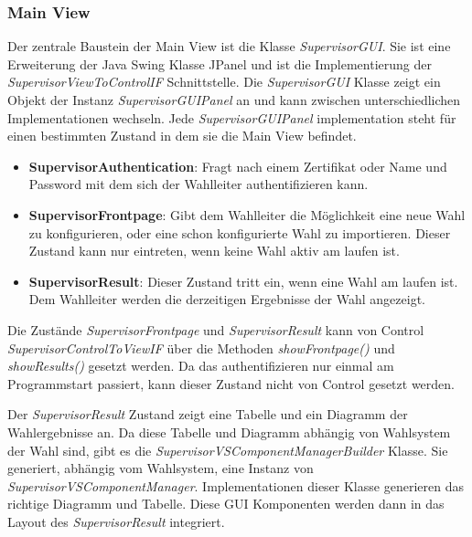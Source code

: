 \documentclass[parskip=full]{scrartcl}
\newcommand{\textitx}[1]{\mbox{\textit{#1}}}
\newcommand{\fakeparagraph}[1]{\textbf{#1}}
\begin{document}
		\subsubsection{Main View}
		Der zentrale Baustein der Main View ist die Klasse \textitx{SupervisorGUI}. Sie ist eine Erweiterung der Java Swing Klasse JPanel und ist die Implementierung der \textit{SupervisorViewToControlIF} Schnittstelle. Die \textitx{SupervisorGUI} Klasse zeigt ein Objekt der Instanz \textitx{SupervisorGUIPanel} an und kann zwischen unterschiedlichen Implementationen wechseln. Jede \textitx{SupervisorGUIPanel} implementation steht für einen bestimmten Zustand in dem sie die Main View befindet.
		\begin{itemize}
			\item\fakeparagraph{SupervisorAuthentication}: Fragt nach einem Zertifikat oder Name und Password mit dem sich der Wahlleiter authentifizieren kann.
			\item\fakeparagraph{SupervisorFrontpage}: Gibt dem Wahlleiter die Möglichkeit eine neue Wahl zu konfigurieren, oder eine schon konfigurierte Wahl zu importieren. Dieser Zustand kann nur eintreten, wenn keine Wahl aktiv am laufen ist.
			\item\fakeparagraph{SupervisorResult}: Dieser Zustand tritt ein, wenn eine Wahl am laufen ist. Dem Wahlleiter werden die derzeitigen Ergebnisse der Wahl angezeigt.
		\end{itemize}
	
		Die Zustände \textitx{SupervisorFrontpage} und \textitx{SupervisorResult} kann von Control \textit{SupervisorControlToViewIF} über die Methoden \textitx{showFrontpage()} und \textitx{showResults()} gesetzt werden. Da das authentifizieren nur einmal am Programmstart passiert, kann dieser Zustand nicht von Control gesetzt werden.
		
		Der \textitx{SupervisorResult} Zustand zeigt eine Tabelle und ein Diagramm der Wahlergebnisse an. Da diese Tabelle und Diagramm abhängig von Wahlsystem der Wahl sind, gibt es die \textit{SupervisorVSComponentManagerBuilder} Klasse. Sie generiert, abhängig vom Wahlsystem, eine Instanz von \textit{SupervisorVSComponentManager}. Implementationen dieser Klasse generieren das richtige Diagramm und Tabelle. Diese GUI Komponenten werden dann in das Layout des \textitx{SupervisorResult} integriert.
		
\end{document}
